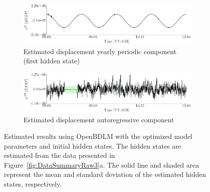 \begin{figure}[htbp]
\ContinuedFloat
\begin{subfigure}{\linewidth}\centering
\includegraphics[width=0.9\linewidth]{./docfigs/Example_DISPSIM_ANOMALY/optim_param_optim_initialhiddenstate/DISP_S1_4.pdf}
\caption{Estimated displacement yearly periodic component (first hidden state)}
\end{subfigure}
\begin{subfigure}{\linewidth}\centering
\includegraphics[width=0.9\linewidth]{./docfigs/Example_DISPSIM_ANOMALY/optim_param_optim_initialhiddenstate/DISP_AR_6.pdf} 
\caption{Estimated displacement autoregressive component}
\end{subfigure}
\caption{Estimated results using OpenBDLM with the optimized model parameters and initial hidden states. The hidden states are estimated from the data presented in Figure~\ref{fig:DataSummaryRaw3}a. The solid line and shaded area represent the mean and standard deviation of the estimated hidden states, respectively.}
\label{fig:DISPSIMANOMALYOptimizedOptimizedExample3}
\end{figure}



